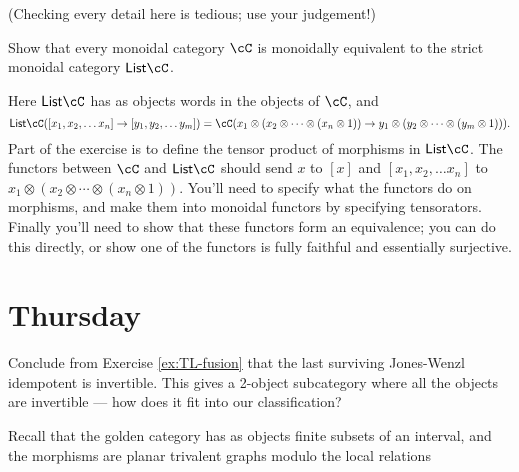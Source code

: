 \documentclass[11pt]{article}
\begin{document}
\begin{exercise}
(Checking every detail here is tedious; use your judgement!)

Show that every monoidal category $\cC$ is monoidally equivalent to the strict monoidal category $\mathsf{List} \cC$.

Here $\mathsf{List} \cC$ has as objects words in the objects of $\cC$, and $$\mathsf{List} \cC([x_1, x_2, \ldots x_n] \to [y_1, y_2, \ldots y_m]) = \cC(x_1 \otimes (x_2 \otimes \cdots \otimes (x_n \otimes 1)) \to y_1 \otimes (y_2 \otimes \cdots \otimes (y_m \otimes 1))).$$ Part of the exercise is to define the tensor product of morphisms in $\mathsf{List} \cC$. The functors between $\cC$ and $\mathsf{List} \cC$ should send $x$ to $[x]$ and $[x_1, x_2, \ldots x_n]$ to $x_1 \otimes (x_2 \otimes \cdots \otimes (x_n \otimes 1))$. You'll need to specify what the functors do on morphisms, and make them into monoidal functors by specifying tensorators. Finally you'll need to show that these functors form an equivalence; you can do this directly, or show one of the functors is fully faithful and essentially surjective.
\end{exercise}

\section{Thursday}

\begin{exercise}
Conclude from Exercise \ref{ex:TL-fusion} that the last surviving Jones-Wenzl idempotent is invertible.  This gives a 2-object subcategory where all the objects are invertible --- how does it fit into our classification?
\end{exercise}

Recall that the golden category has as objects finite subsets of an interval, and the morphisms are planar trivalent graphs modulo the local relations
\newcommand{\drawI}{ \begin{tikzpicture}[baseline=0cm]
 	\draw (0,.2) .. controls +(30:.3cm) .. (45:.8cm);
 	\draw (0,.2) .. controls +(150:.3cm) .. (135:.8cm);
	\draw (0,.2) -- (0,-.2);
 	\draw (0,-.2) .. controls +(-30:.3cm) .. (-45:.8cm);
 	\draw (0,-.2) .. controls +(-150:.3cm) .. (-135:.8cm);
\end{tikzpicture}
}

\newcommand{\drawH}{ \begin{tikzpicture}[baseline=0cm,rotate=90]
 	\draw (0,.2) .. controls +(30:.3cm) .. (45:.8cm);
 	\draw (0,.2) .. controls +(150:.3cm) .. (135:.8cm);
	\draw (0,.2) -- (0,-.2);
 	\draw (0,-.2) .. controls +(-30:.3cm) .. (-45:.8cm);
 	\draw (0,-.2) .. controls +(-150:.3cm) .. (-135:.8cm);
\end{tikzpicture}}
\end{document}
